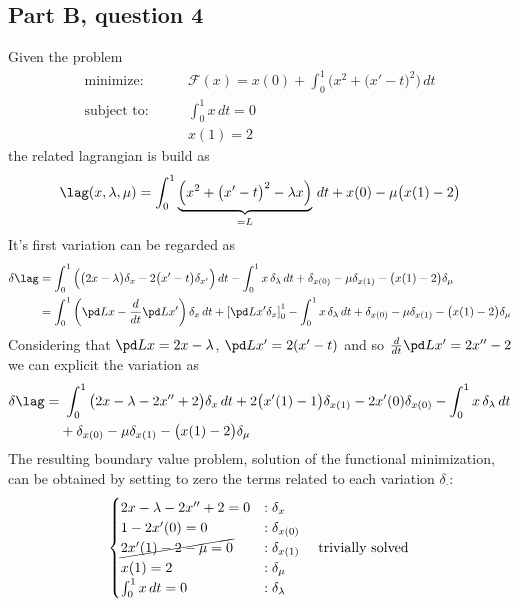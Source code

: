 \subsection*{Part B, question 4}
	Given the problem
	\begin{align*}
		\textrm{minimize:} \qquad & \mathcal F(x) = x(0) + \int_0^1 \Big(x^2 + \big(x'-t\big)^2 \Big)\, dt \\
		\textrm{subject to:} \qquad & \int_0^1 x\, dt = 0 \\ & x(1) = 2
	\end{align*}
	the related lagrangian is build as
	\[ \lag(x,\lambda,\mu) = \int_0^1 \underbrace{\Big( x^2 + \big(x'-t\big)^2 - \lambda x\Big)}_{=L}\, dt + x(0) - \mu \big(x(1)-2\big) \]
	It's first variation can be regarded as
	\begin{align*}
		\delta \lag & = \int_0^1 \Big( \big(2x - \lambda\big) \delta_x - 2\big(x'-t\big) \delta_{x'} \Big) \, dt - \int_0^1 x\,\delta_\lambda\, dt + \delta_{x(0)} - \mu \delta_{x(1)} - \big(x(1)-2\big) \delta_\mu \\
		& = \int_0^1 \left( \pd L x - \frac d {dt} \pd L{x'}\right) \delta_x\, dt + \left[\pd L{x'} \delta_x\right]_0^1  - \int_0^1 x\,\delta_\lambda\, dt + \delta_{x(0)} - \mu \delta_{x(1)} - \big(x(1)-2\big) \delta_\mu 
	\end{align*}
	Considering that $\pd L x = 2x- \lambda$, $\pd L{x'} = 2(x'-t)$ and so $\frac d{dt}\pd L{x'} = 2x''- 2$ we can explicit the variation as
	\begin{align*}
		\delta \lag = &\ \int_0^1 \big( 2x - \lambda -2x''+2  \big) \delta_x \, dt + 2\big(x'(1) - 1\big) \delta_{x(1)} - 2 x'(0) \delta_{x(0)} - \int_0^1 x\,\delta_\lambda\, dt \\ & + \delta_{x(0)} - \mu \delta_{x(1)} - \big(x(1)-2\big) \delta_\mu
	\end{align*}
	The resulting boundary value problem, solution of the functional minimization, can be obtained by setting to zero the terms related to each variation $\delta_\cdot$:
	\[ \begin{cases}
		2x - \lambda - 2x'' + 2 = 0 & : \delta_x \\
		1-2x'(0) = 0 & : \delta_{x(0)} \\
		\cancel{2x'(1) -2 - \mu = 0 } & : \delta_{x(1)} \quad \textrm{ trivially solved} \\
		x(1) = 2 & :\delta_\mu \\
		\int_0^1 x\, dt = 0 &: \delta_\lambda
	\end{cases} \]

